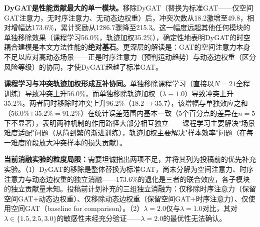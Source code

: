 \documentclass[12pt,a4paper,UTF8]{ctexart}
\begin{document}
\begin{table}[H]
    \centering
    \caption{消融实验结果（21架eVTOL，5次独立测试，均值$\pm$标准差）}
    \label{tab:ablation}
\end{table}

\textbf{DyGAT是性能贡献最大的单一模块。}移除DyGAT（替换为标准GAT——仅空间GAT注意力，无时序注意力、无动态边权重）后，冲突次数从18.2激增至49.8，相对增幅达173.6\%，累计奖励从1286.7骤降至215.3。这一幅度远超其他任何模块的单独移除效果（课程学习56.0\%，轨迹加权35.2\%），确定性地表明DyGAT的时空耦合建模是本文方法性能的\textbf{绝对基石}。更深层的解读是：GAT的空间注意力本身不足以应对高动态场景——正是时序注意力（预判运动趋势）与动态边权重（区分风险等级）的协同，才使DyGAT超越了标准GAT。

\textbf{课程学习与冲突轨迹加权形成互补协同。}单独移除课程学习（直接以$N=21$全程训练）导致冲突上升56.0\%，而单独移除轨迹加权（$\lambda \equiv 1.0$）导致冲突上升35.2\%。两者同时移除时冲突上升96.2\%（18.2$\to$35.7），该增幅与单独效应之和（56.0\%$+$35.2\%$=91.2\%$）在统计误差范围内基本一致（5个百分点的差异在$n=5$下不显著），表明两种机制的作用路径大部分相互独立——课程学习主要解决"场景难度适配"问题（从简到繁的渐进训练），轨迹加权主要解决"样本效率"问题（在每一难度阶段放大冲突样本的损失贡献）。

\textbf{当前消融实验的粒度局限：}需要坦诚指出两项不足，并将其列为投稿前的优先补充实验。（1）DyGAT的移除是整体替换为标准GAT，尚未分解为空间注意力、时序注意力与动态边权重的独立消融——173.6\%的退化是三者的联合效应，各子模块的独立贡献量未知。投稿前计划补充的三组独立消融为：仅移除时序注意力（保留空间GAT$+$动态边权重）、仅移除动态边权重（保留空间GAT$+$时序注意力）、仅使用空间GAT（baseline for comparison）。（2）$\lambda=2.0$仅与$\lambda=1.0$对比，其对$\lambda \in \{1.5, 2.5, 3.0\}$的敏感性未经充分验证——$\lambda=2.0$的最优性无法确认。
\end{document}
